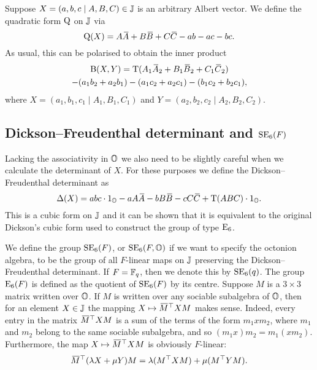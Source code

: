 Suppose $X = (a,b,c \mid A,B,C) \in \mathbb{J}$ is an arbitrary Albert vector. We define
the quadratic form $\mathord{\mathrm{Q}}$ on $\mathbb{J}$ via
\begin{equation}
	\label{eq:qform_on_J}
	\QQ(X) = A\ovA + B\ovB + C\ovC - ab - ac - bc.
\end{equation}
As usual, this can be polarised to obtain the inner product
\begin{multline}
	\label{eq:inner_product_in_J}
	\BB(X,Y) = \Tr( A_1 \ovA_2 + B_1 \ovB_2 + C_1 \ovC_2 ) \\
		- (a_1 b_2 + a_2 b_1) - (a_1 c_2 + a_2 c_1) - (b_1 c_2 + b_2 c_1),
\end{multline}
where $X = (a_1, b_1, c_1 \mid A_1, B_1, C_1)$ and $Y = (a_2, b_2, c_2 \mid A_2, B_2, C_2 )$.


\subsection{Dickson--Freudenthal determinant and $\mathrm{SE}_6(F)$}

Lacking the associativity in $\mathbb{O}$ we also need to be slightly careful when we calculate
the determinant of $X$. For these purposes we define the Dickson--Freudenthal determinant
as
\begin{equation}
	\fdet(X) = abc \cdot 1_{\O} - aA\ovA - bB\ovB - cC\ovC + \Tr(ABC) \cdot 1_{\O}.
\end{equation}
This is a cubic form on $\mathbb{J}$ and it can be shown that it is equivalent to the 
original Dickson's cubic form \cite{Dickson1} used to construct the group of type $\mathrm{E}_6$. 

We define the group $\mathrm{SE}_6(F)$, or $\mathrm{SE}_6(F,\mathbb{O})$ if we want to specify the octonion 
algebra, to be the group of all $F$-linear maps on $\mathbb{J}$ preserving
 the Dickson--Freudenthal determinant. If $F = \mathbb{F}_q$, then we denote this by $\mathrm{SE}_6(q)$.
  The group $\mathord{\mathrm{E}}_6(F)$ is defined as the quotient
 of $\mathrm{SE}_6(F)$ by its centre.
Suppose $M$ is a $3\times 3$ matrix written over $\mathbb{O}$. If $M$ is written over any 
sociable subalgebra of $\mathbb{O}$, then for an element $X \in \mathbb{J}$ the mapping 
$X \mapsto \mathord{\mbox{\hspace*{0pt}}\,\overline{\!M\!\!\;}\!\:}\mbox{\hspace*{0pt}}^{\top} X M$ makes sense. Indeed, every entry in the matrix $\mathord{\mbox{\hspace*{0pt}}\,\overline{\!M\!\!\;}\!\:}\mbox{\hspace*{0pt}}^{\top} X M$
is a sum of the terms of the form $m_1 x m_2$, where $m_1$ and $m_2$ belong to the same
sociable subalgebra, and so $(m_1 x) m_2 = m_1 (x m_2)$. Furthermore, the map
$X \mapsto \mathord{\mbox{\hspace*{0pt}}\,\overline{\!M\!\!\;}\!\:}\mbox{\hspace*{0pt}}^{\top} X M$ is obviously $F$-linear:
\begin{equation}
	\mathord{\mbox{\hspace*{0pt}}\,\overline{\!M\!\!\;}\!\:}\mbox{\hspace*{0pt}}^{\top} (\lambda X + \mu Y) M = \lambda (  M^{\top} X M ) + \mu ( M^{\top} Y M ).
\end{equation}

